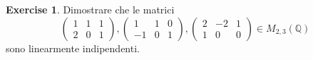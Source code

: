 \documentclass{article}
\theoremstyle{plain}
\theoremstyle{definition}
\newtheorem{xca}[exmp]{Exercise}
\theoremstyle{remark}
\begin{document}
\vspace{10pt}

\begin{bxthm}
\begin{xca}
    Dimostrare che le matrici
    \[\begin{pmatrix}
        1&1&1\\
        2&0&1
    \end{pmatrix},\begin{pmatrix}
        1&1&0\\
        -1&0&1
    \end{pmatrix},\begin{pmatrix}
        2&-2&1\\
        1&0&0
    \end{pmatrix}\in M_{2,3}(\mathbb{Q})\]
    sono linearmente indipendenti.
\end{xca}
\end{bxthm}

\vspace{10pt}
\end{document}
